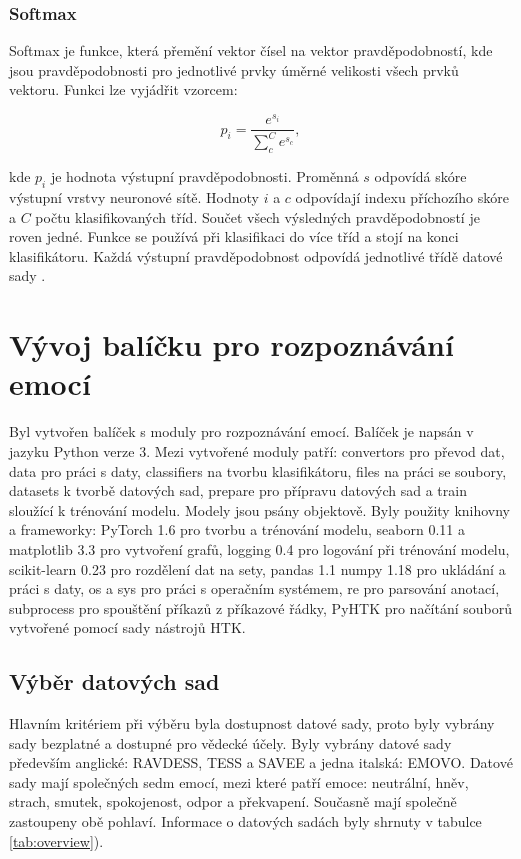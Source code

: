 \documentclass[FM,BP]{tulthesis}
\begin{document}
\subsection{Softmax} %
Softmax je funkce, která přemění vektor čísel na vektor pravděpodobností, kde jsou pravděpodobnosti pro jednotlivé prvky úměrné velikosti všech prvků vektoru. Funkci lze vyjádřit vzorcem:

\begin{equation}
\label{eqn:softmax}
p_i = \frac{e^{s_i}}{\sum_{c}^{C}e^{s_c}},
\end{equation}

kde $ p_i $ je hodnota výstupní pravděpodobnosti. Proměnná $ s $ odpovídá skóre výstupní vrstvy neuronové sítě. Hodnoty $ i $ a $ c $ odpovídají indexu příchozího skóre a $ C $ počtu klasifikovaných tříd. Součet všech výsledných pravděpodobností je roven jedné. Funkce se používá při klasifikaci do více tříd a stojí na konci klasifikátoru. Každá výstupní pravděpodobnost odpovídá jednotlivé třídě datové sady \cite{brownlee_2020_Softmax}.

\chapter{Vývoj balíčku pro rozpoznávání emocí} %
Byl vytvořen balíček s moduly pro rozpoznávání emocí. Balíček je napsán v jazyku Python verze 3. Mezi vytvořené moduly patří: convertors pro převod dat, data pro práci s daty, classifiers na tvorbu klasifikátoru, files na práci se soubory, datasets k tvorbě datových sad, prepare pro přípravu datových sad a train sloužící k trénování modelu. Modely jsou psány objektově. Byly použity knihovny a frameworky: PyTorch 1.6 pro tvorbu a trénování modelu, seaborn 0.11 a matplotlib 3.3 pro vytvoření grafů, logging 0.4 pro logování při trénování modelu, scikit-learn 0.23 pro rozdělení dat na sety, pandas 1.1 numpy 1.18 pro ukládání a práci s daty, os a sys pro práci s operačním systémem, re pro parsování anotací, subprocess pro spouštění příkazů z příkazové řádky, PyHTK pro načítání souborů vytvořené pomocí sady nástrojů HTK.

\section{Výběr datových sad} %
Hlavním kritériem při výběru byla dostupnost datové sady, proto byly vybrány sady bezplatné a dostupné pro vědecké účely. Byly vybrány datové sady především anglické: RAVDESS, TESS a SAVEE a jedna italská: EMOVO. Datové sady mají společných sedm emocí, mezi které patří emoce: neutrální, hněv, strach, smutek, spokojenost, odpor a překvapení. Současně mají společně zastoupeny obě pohlaví. Informace o datových sadách byly shrnuty v tabulce \ref{tab:overview}).
\end{document}
